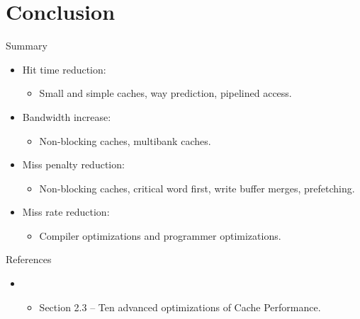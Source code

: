 \section{Conclusion}

\begin{frame}[t]{Summary}
\begin{itemize}
  \item Hit time reduction:
    \begin{itemize}
      \item Small and simple caches, way prediction, pipelined access.
    \end{itemize}

  \item Bandwidth increase:
    \begin{itemize}
      \item Non-blocking caches, multibank caches.
    \end{itemize}

  \item Miss penalty reduction:
    \begin{itemize}
      \item Non-blocking caches, critical word first, write buffer merges, prefetching.
    \end{itemize}

  \item Miss rate reduction:
    \begin{itemize}
      \item Compiler optimizations and programmer optimizations.
    \end{itemize}
\end{itemize}
\end{frame}


\begin{frame}[t]{References}
\begin{itemize}
  \item \bibhennessy
    \begin{itemize}
       \item Section 2.3 -- Ten advanced optimizations of Cache Performance.
    \end{itemize}
\end{itemize}
\end{frame}
